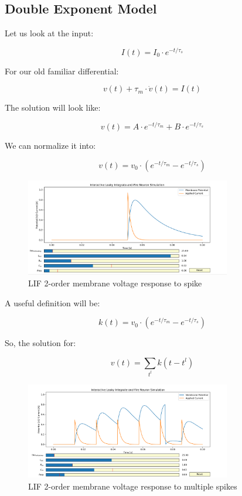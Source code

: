 \subsection{Double Exponent Model}

Let us look at the input:

\begin{equation}
    I(t) = I_0 \cdot e^{-t/\tau_s}
\end{equation}

For our old familiar differential:

\begin{equation}
    v(t) + \tau_m \cdot \dot{v}(t) = I(t)
\end{equation}

The solution will look like:

\begin{equation}
    v(t) = A \cdot e^{-t/\tau_m} + B \cdot e^{-t/\tau_s}
\end{equation}

We can normalize it into:

\begin{equation}
    v(t) = v_0 \cdot (e^{-t/\tau_m} - e^{-t/\tau_s})
\end{equation}

\begin{figure}[H]
    \centering
    \includegraphics[width=0.8\textwidth]{methods/computational-models/graphs/LIF-second-order.png}
    \caption{LIF 2-order membrane voltage response to spike}
    \label{fig:LIF-second-order}
\end{figure}

A useful definition will be:

\begin{equation}
    k(t) = v_0 \cdot (e^{-t/\tau_m} - e^{-t/\tau_s})
\end{equation}

So, the solution for:

\begin{equation}
    v(t) = \sum_{t^l} k(t - t^l)
\end{equation}

\begin{figure}[H]
    \centering
    \includegraphics[width=0.8\textwidth]{methods/computational-models/graphs/LIF-spike-response-second-order.png}
    \caption{LIF 2-order membrane voltage response to multiple spikes}
    \label{fig:LIF-second-order-spike-response}
\end{figure}
